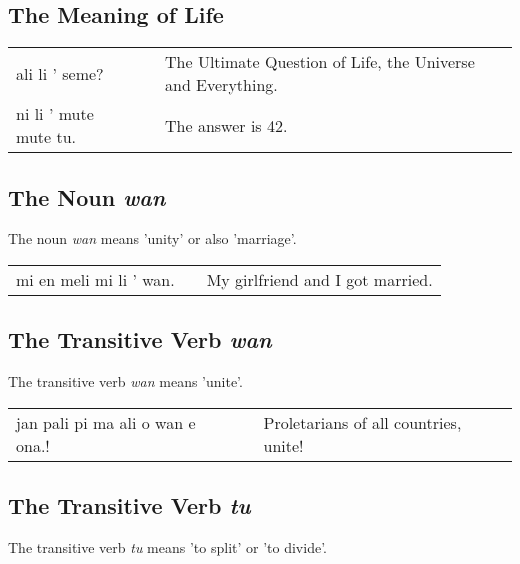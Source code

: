 %
%

%
%
%
\subsection*{The Meaning of Life}
%

\begin{supertabular}{p{5,5cm}|ll}
ali li ' seme? &&  The Ultimate Question of Life, the Universe and Everything. \\
ni li ' mute mute tu.  && The answer is 42. \\
\end{supertabular} 
%

%
\subsection*{The Noun \textit{wan}}
%
%
The noun \textit{wan} means 'unity' or also 'marriage'.

\begin{supertabular}{p{5,5cm}|ll}
mi en meli mi li ' wan. && My girlfriend and I got married. \\
\end{supertabular} 

%
\subsection*{The Transitive Verb \textit{wan}}
%
%
The transitive verb \textit{wan} means 'unite'. 

\begin{supertabular}{p{5,5cm}|ll}
jan pali pi ma ali o wan e ona.! && Proletarians of all countries, unite! \\
\end{supertabular} 

%
\subsection*{The Transitive Verb \textit{tu}}
%
%
The transitive verb \textit{tu} means 'to split' or 'to divide'. 

